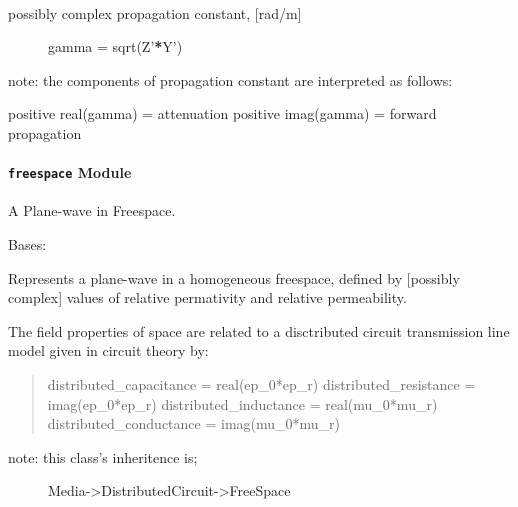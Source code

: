 \documentclass[letterpaper,10pt,english]{sphinxmanual}
\begin{document}
\begin{fulllineitems}
\begin{fulllineitems}
\label{api/mwavepy.media:mwavepy.media.distributedCircuit.DistributedCircuit.gamma}~\begin{description}
\item[{possibly complex propagation constant, {[}rad/m{]}}] \leavevmode
gamma = sqrt(Z'{\color{red}\bfseries{}*}Y')

\end{description}

note:
the components of propagation constant are interpreted as follows:

positive real(gamma) = attenuation
positive imag(gamma) = forward propagation

\end{fulllineitems}


\end{fulllineitems}



\paragraph{\texttt{freespace} Module}
\label{api/mwavepy.media:freespace-module}\label{api/mwavepy.media:module-mwavepy.media.freespace}
A Plane-wave in Freespace.

\begin{fulllineitems}
\label{api/mwavepy.media:mwavepy.media.freespace.Freespace}
Bases: {\hyperref[api/mwavepy.media:mwavepy.media.distributedCircuit.DistributedCircuit]{}}

Represents a plane-wave in a homogeneous freespace, defined by
{[}possibly complex{]} values of relative permativity and 
relative permeability.

The field properties of space are related to a disctributed 
circuit transmission line model given in circuit theory by:
\begin{quote}

distributed\_capacitance = real(ep\_0*ep\_r)
distributed\_resistance = imag(ep\_0*ep\_r)
distributed\_inductance = real(mu\_0*mu\_r)
distributed\_conductance = imag(mu\_0*mu\_r)
\end{quote}
\begin{description}
\item[{note: this class's inheritence is;}] \leavevmode
Media-\textgreater{}DistributedCircuit-\textgreater{}FreeSpace

\end{description}

\end{fulllineitems}
\end{document}
